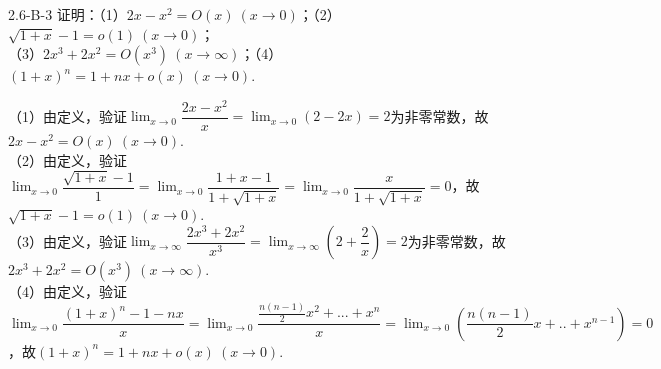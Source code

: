 \begin{example}{2.6-B-3}{}
    证明：（1）$2x-x^2=O(x)~(x\to 0)$；（2）$\sqrt{1+x}-1=o(1)~(x\to 0)$；\\
    （3）$2x^3+2x^2=O(x^3)~(x\to\infty)$；（4）$(1+x)^n=1+nx+o(x)~(x\to 0)$.
\end{example}
\begin{solution}
    （1）由定义，验证$\displaystyle \lim_{x\to 0}\dfrac{2x-x^2}{x}=\lim_{x\to 0}(2-2x)=2$为非零常数，故$2x-x^2=O(x)~(x\to 0)$.\\
    （2）由定义，验证$\displaystyle \lim_{x\to 0}\dfrac{\sqrt{1+x}-1}{1}=\lim_{x\to 0}\dfrac{1+x-1}{1+\sqrt{1+x}}=\lim_{x\to 0}\dfrac{x}{1+\sqrt{1+x}}=0$，故$\sqrt{1+x}-1=o(1)~(x\to 0)$.\\
    （3）由定义，验证$\displaystyle \lim_{x\to\infty}\dfrac{2x^3+2x^2}{x^3}=\lim_{x\to\infty}(2+\dfrac{2}{x})=2$为非零常数，故$2x^3+2x^2=O(x^3)~(x\to\infty)$.\\（4）由定义，验证$\displaystyle \lim_{x\to 0}\dfrac{(1+x)^n-1-nx}{x}=\lim_{x\to 0}\dfrac{\frac{n(n-1)}{2}x^2+...+x^n}{x}=\lim_{x\to 0}\left(\dfrac{n(n-1)}{2}x+..+x^{n-1}\right)=0$，故$(1+x)^n=1+nx+o(x)~(x\to 0)$.
\end{solution}

    